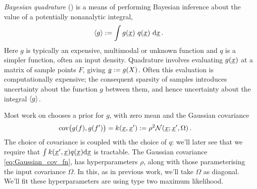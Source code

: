 \documentclass[twoside]{article}
\begin{document}
\emph{Bayesian quadrature} (\bq) \citep{BZHermiteQuadrature,BZMonteCarlo} is a means of performing Bayesian inference about the value of a potentially nonanalytic integral, \begin{equation}\label{eq:bq_integral}
\langle g \rangle := \int g(\underline{\smash{x}})~ q(\underline{\smash{x}})~\mathrm{d} \underline{\smash{x}}\,.
\end{equation}
Here $g$ is typically an expensive, multimodal or unknown function and $q$ is a simpler function, often an input density. 
Quadrature involves evaluating $g(\underline{\smash{x}})$ at a matrix of sample points $F$, giving $\underline{\smash{g}}:= g(X)$. Often this evaluation is computationally expensive; the consequent sparsity of samples introduces uncertainty about the function $g$ between them, and hence uncertainty about the integral $\langle g \rangle$.

Most work on \bq chooses a \gp prior for $g$, with zero mean and the Gaussian covariance 
\begin{align} \label{eq:Gaussian_cov_fn}
\text{cov}\bigl(g(f),g(f')\bigr)=k(\underline{\smash{x}},\underline{\smash{x}}') & := \rho^2 \mathcal{N}(\underline{\smash{x}};\underline{\smash{x}}',\Omega)\,.
\end{align} 
The choice of covariance is coupled with the choice of $q$: we'll later see that we require that $\int k(\underline{\smash{x}}',\underline{\smash{x}}) q(\underline{\smash{x}}) \mathrm{d}\underline{\smash{x}}$ is tractable.
The Gaussian covariance \eqref{eq:Gaussian_cov_fn}, has hyperparameters $\rho$, along with those parameterising the input covariance $\Omega$. In this, as in previous work, we'll take $\Omega$ as diagonal.  We'll fit these hyperparameters are using type two maximum likelihood. 
\end{document}
